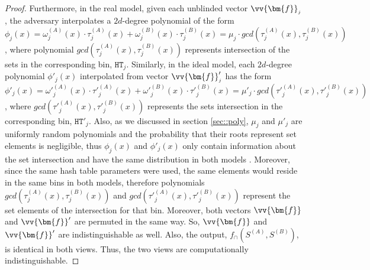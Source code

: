 \begin{proof}
Furthermore, in the real model, given each unblinded vector $\vv{\bm{f}}_{\scriptscriptstyle j}$, the adversary interpolates a $2d$-degree polynomial of the form $\phi_{\scriptscriptstyle j}(x)=\omega^{\scriptscriptstyle (A)}_{\scriptscriptstyle j}(x)\cdot \tau^{\scriptscriptstyle (A)}_{\scriptscriptstyle j}(x)+\omega^{\scriptscriptstyle (B)}_{\scriptscriptstyle j}(x)\cdot \tau^{\scriptscriptstyle (B)}_{\scriptscriptstyle j}(x)=\mu_{\scriptscriptstyle j}\cdot gcd(\tau^{\scriptscriptstyle (A)}_{\scriptscriptstyle j}(x),\tau^{\scriptscriptstyle (B)}_{\scriptscriptstyle j}(x))$,   where polynomial $gcd(\tau^{\scriptscriptstyle (A)}_{\scriptscriptstyle j}(x),\tau^{\scriptscriptstyle (B)}_{\scriptscriptstyle j}(x))$ represents intersection of the sets  in the corresponding bin, $\mathtt{HT}_{\scriptscriptstyle j}$. Similarly, in the ideal model, each $2d$-degree polynomial $\phi'_{\scriptscriptstyle j}(x)$ interpolated from vector $\vv{\bm{f}}'_{\scriptscriptstyle j}$ has the form $\phi'_{\scriptscriptstyle j}(x)=\omega'^{\scriptscriptstyle (A)}_{\scriptscriptstyle j}(x)\cdot \tau'^{\scriptscriptstyle (A)}_{\scriptscriptstyle j}(x)+\omega'^{\scriptscriptstyle (B)}_{\scriptscriptstyle j}(x)\cdot \tau'^{\scriptscriptstyle (B)}_{\scriptscriptstyle j}(x)=\mu'_{\scriptscriptstyle j}\cdot gcd(\tau'^{\scriptscriptstyle (A)}_{\scriptscriptstyle j}(x),\tau'^{\scriptscriptstyle (B)}_{\scriptscriptstyle j}(x))$, where $gcd(\tau'^{\scriptscriptstyle (A)}_{\scriptscriptstyle j}(x),\tau'^{\scriptscriptstyle (B)}_{\scriptscriptstyle j}(x))$ represents the sets intersection in the corresponding bin, $\mathtt{HT}'_{\scriptscriptstyle j}$. Also, as we discussed in section \ref{sec::poly}, $\mu_{\scriptscriptstyle j}$ and $\mu'_{\scriptscriptstyle j}$ are  uniformly random polynomials and the probability that their roots represent  set elements is negligible, thus   $\phi_{\scriptscriptstyle j}(x)$ and $\phi'_{\scriptscriptstyle j}(x)$  only contain information about the set intersection and have the same distribution in both models  \cite{DBLP:conf/crypto/KissnerS05,BonehGHWW13}. Moreover, since the same hash table parameters were used, the same elements would reside in the same bins in both models, therefore  polynomials $gcd(\tau^{\scriptscriptstyle (A)}_{\scriptscriptstyle j}(x),\tau^{\scriptscriptstyle (B)}_{\scriptscriptstyle j}(x))$ and $gcd(\tau'^{\scriptscriptstyle (A)}_{\scriptscriptstyle j}(x),\tau'^{\scriptscriptstyle (B)}_{\scriptscriptstyle j}(x))$ represent the set elements of the  intersection for that bin.    Moreover, both vectors $\vv{\bm{f}}$ and $\vv{\bm{f}}'$ are permuted in the same way. So, $\vv{\bm{f}}$ and $\vv{\bm{f}}'$ are indistinguishable as well. Also, the output, $ f_{\scriptscriptstyle \cap}(S^{\scriptscriptstyle (A)},S^{\scriptscriptstyle (B)})$, is identical in both views. Thus,  the two views are computationally indistinguishable. 




\end{proof}
